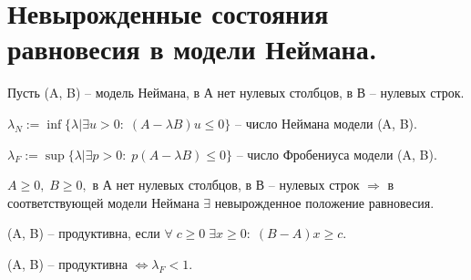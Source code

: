\chapter{Невырожденные состояния равновесия в модели Неймана.}\label{cha:16}

Пусть (A, B) -- модель Неймана, в А нет нулевых столбцов, в В -- нулевых строк.

\begin{sign}
	$\lambda_N := \inf \{ \lambda | \exists u > 0: \; (A - \lambda B)u \leq 0\}$ -- число Неймана модели (A, B).

	$\lambda_F := \sup \{ \lambda | \exists p > 0: \; p(A - \lambda B) \leq 0\}$ -- число Фробениуса модели (A, B).
\end{sign}

\begin{theorem}
	$A \geq 0, \; B \geq 0, $ в А нет нулевых столбцов, в В -- нулевых строк $\Rightarrow $ в соответствующей модели Неймана $\exists$ невырожденное положение равновесия.
\end{theorem}

\begin{definition}
	(A, B) -- продуктивна, если $\forall \; c \geq 0 \; \exists x \geq 0: \; (B - A)x \geq c.$
\end{definition}

\begin{theorem}
	(A, B) -- продуктивна $\Longleftrightarrow \lambda_F < 1.$ 
\end{theorem}




